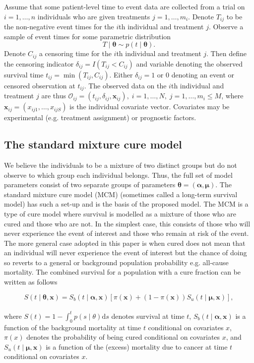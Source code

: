 \documentclass[AMA,STIX1COL]{WileyNJD-v2}
\begin{document}
Assume that some patient-level time to event data are collected from a trial on $i = 1, \ldots, n$ individuals who are given treatments $j = 1, \ldots, m_i$.
Denote $T_{ij}$ to be the non-negative event times for the $i$th individual and treatment $j$.
Observe a sample of event times for some parametric distribution
\[
T \mid \bm{\theta} \sim p(t \mid \bm{\theta}).
\]
Denote $C_{ij}$ a censoring time for the $i$th individual and treatment $j$.
Then define the censoring indicator $\delta_{ij} = I(T_{ij} < C_{ij})$ and variable denoting the observed survival time $t_{ij} = \min(T_{ij}, C_{ij})$.
Either $\delta_{ij} = 1$ or $0$ denoting an event or censored observation at $t_{ij}$.
The observed data on the $i$th individual and treatment $j$ are thus
$\mathcal{O}_{ij} = (t_{ij}, \delta_{ij}, \boldsymbol{x}_{ij}),\; i = 1, \ldots, N, \; j = 1, \ldots, m_i \leq M$,
where $\boldsymbol{x}_{ij} = (x_{ij1}, \ldots, x_{ijS})$ is the individual covariate vector.
Covariates may be experimental (e.g. treatment assignment) or prognostic factors.


\subsection{The standard mixture cure model} \label{section:basic_model}

We believe the individuals to be a mixture of two distinct groups but do not observe to which group each individual belongs.
Thus, the full set of model parameters consist of two separate groups of parameters $\bm\theta = (\bm\alpha, \bm\mu)$.
The standard mixture cure model (MCM) (sometimes called a long-term survival model) has such a set-up and is the basis of the proposed model.
The MCM is a type of cure model where survival is modelled as a mixture of those who are cured and those who are not.
In the simplest case, this consists of those who will never experience the event of interest and those who remain at risk of the event.
The more general case adopted in this paper is when cured does not mean that an individual will never experience the event of interest but the chance of doing so reverts to a general or background population probability e.g. all-cause mortality.
The combined survival for a population with a cure fraction can be written as follows

\begin{equation}
\label{eqn:mcm}
S(t \mid \bm\theta, \bm{x}) = S_b(t \mid \bm\alpha, \bm{x}) [\pi(\bm{x}) + (1 - \pi(\bm{x})) S_u(t \mid \bm\mu, \bm{x})],
\end{equation}
\\
\noindent
where $S(t) = 1 - \int_0^t p(s \mid \theta) \text{d}s$ denotes survival at time $t$,
$S_b(t \mid \bm\alpha, \bm{x})$ is a function of the background mortality at time $t$ conditional on covariates $x$,
$\pi(x)$ denotes the probability of being cured conditional on covariates $x$,
and $S_u(t \mid \bm\mu, \bm{x})$ is a function of the (excess) mortality due to cancer at time $t$ conditional on covariates $x$.
\end{document}

